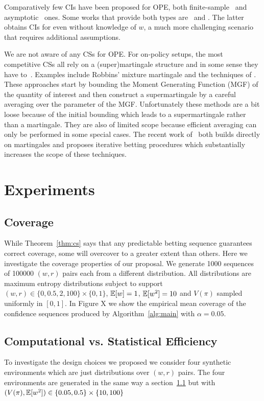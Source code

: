Comparatively few CIs have been proposed for OPE, both 
finite-sample~\cite{thomas2015high} and 
asymptotic~\cite{li2015counterfactual,karampatziakis2019empirical} ones.
Some works that provide both types are~\cite{bottou2013counterfactual} 
and \cite{dai2020coindice}. The latter obtains CIs for
even without knowledge of
$w$, a much more challenging scenario that 
requires additional assumptions.

We are not aware of any CSs for OPE.
For on-policy setups, the most competitive CSs all rely on a 
(super)martingale structure and in some 
sense they have to~\cite{ramdas2020admissible}.
Examples include Robbins' mixture martingale 
\cite{robbins_statistical_1970} and the techniques of 
\cite{howard_uniform_2019}. These approaches 
start by bounding the Moment Generating 
Function (MGF) of the quantity of interest and then
construct a supermartingale by a careful 
averaging over the parameter of the MGF.
Unfortunately these methods are a bit 
loose because of the initial bounding 
which leads to a supermartingale rather
than a martingale. They are also
of limited scope because efficient 
averaging can only be performed in 
some special cases. The recent work
of~\cite{waudby-smith_variance-adaptive_2020}
both builds directly on martingales
and proposes iterative betting procedures
which substantially increases the scope 
of these techniques.

\section{Experiments}

\subsection{Coverage} \label{sec:coverage}
While Theorem~\ref{thm:cs} says that any predictable betting sequence
guarantees correct coverage, some will overcover to a greater extent than others. Here we investigate the coverage properties of our 
proposal. We generate 1000 sequences of 100000 $(w,r)$ pairs 
each from a different distribution. All distributions are 
maximum entropy distributions subject to
support $(w,r) \in \{0, 0.5, 2, 100\} \times \{0,1\}$,
$\mathbb{E}[w]=1$, $\mathbb{E}[w^2]=10$ and $V(\pi)$ sampled uniformly 
in $[0,1]$. In Figure X we show the 
empirical mean coverage of the confidence sequences produced 
by Algorithm~\ref{alg:main} with $\alpha=0.05$. 

\subsection{Computational vs. Statistical Efficiency}
To investigate the design choices we proposed we consider
four synthetic environments which are just 
distributions over $(w,r)$ pairs. The four environments
are generated in the same way a section~\ref{sec:coverage}
but with $(V(\pi),\mathbb{E}[w^2]) \in \{0.05, 0.5\} \times \{10, 100\}$

